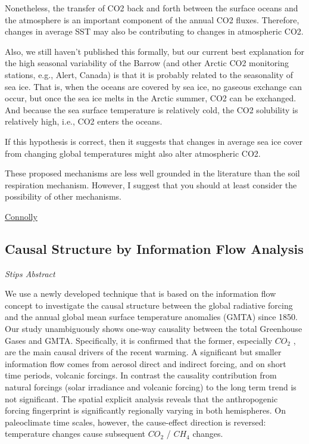 \documentclass[
]{book}
\begin{document}
Nonetheless, the transfer of CO2 back and forth between the surface oceans and the atmosphere is an important component of the annual CO2 fluxes. Therefore, changes in average SST may also be contributing to changes in atmospheric CO2.

Also, we still haven't published this formally, but our current best explanation for the high seasonal variability of the Barrow (and other Arctic CO2 monitoring stations, e.g., Alert, Canada) is that it is probably related to the seasonality of sea ice. That is, when the oceans are covered by sea ice, no gaseous exchange can occur, but once the sea ice melts in the Arctic summer, CO2 can be exchanged. And because the sea surface temperature is relatively cold, the CO2 solubility is relatively high, i.e., CO2 enters the oceans.

If this hypothesis is correct, then it suggests that changes in average sea ice cover from changing global temperatures might also alter atmospheric CO2.

These proposed mechanisms are less well grounded in the literature than the soil respiration mechanism. However, I suggest that you should at least consider the possibility of other mechanisms.

\href{https://www.mdpi.com/2413-4155/2/4/77/review_report}{Connolly}

\hypertarget{causal-structure-by-information-flow-analysis}{%
\subsection{Causal Structure by Information Flow Analysis}\label{causal-structure-by-information-flow-analysis}}

\emph{Stips Abstract}

We use a newly developed technique that is based on
the information flow concept to investigate the
causal structure between the global radiative forcing and
the annual global mean surface temperature anomalies (GMTA) since 1850.
Our study unambiguously shows one-way causality between the total
Greenhouse Gases and GMTA.
Specifically, it is confirmed that the former, especially \(CO_2\) ,
are the main causal drivers of the recent warming.
A significant but smaller information flow comes from aerosol
direct and indirect forcing, and on short time periods, volcanic forcings.
In contrast the causality contribution from natural forcings (solar irradiance
and volcanic forcing) to the long term trend is not significant.
The spatial explicit analysis reveals that the anthropogenic forcing fingerprint
is significantly regionally varying in both hemispheres.
On paleoclimate time scales, however, the cause-effect direction is reversed:
temperature changes cause subsequent \(CO_2\) / \(CH_4\) changes.
\end{document}

